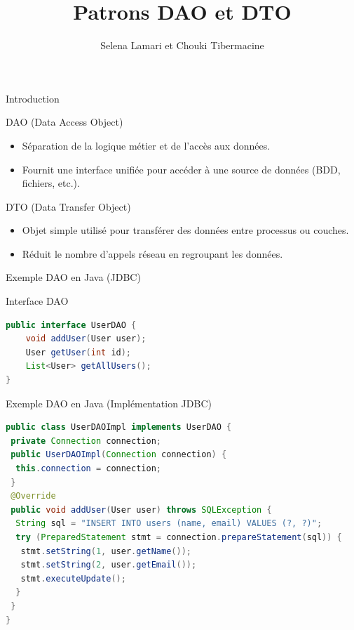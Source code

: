 \documentclass[aspectratio=169,10pt]{beamer}
\title{Patrons DAO et DTO}
\author[C. Tibermacine]{Selena Lamari et Chouki Tibermacine}
\date{}
\begin{document}
	


\begin{frame}{Introduction}
    \begin{block}{DAO (Data Access Object)}
        \begin{itemize}
            \item Séparation de la logique métier et de l'accès aux données.
            \item Fournit une interface unifiée pour accéder à une source de données (BDD, fichiers, etc.).
        \end{itemize}
    \end{block}
    \begin{block}{DTO (Data Transfer Object)}
        \begin{itemize}
            \item Objet simple utilisé pour transférer des données entre processus ou couches.
            \item Réduit le nombre d'appels réseau en regroupant les données.
        \end{itemize}
    \end{block}
\end{frame}

\begin{frame}[fragile]{Exemple DAO en Java (JDBC)}
    \begin{exampleblock}{Interface DAO}
        \begin{lstlisting}[language=Java]
public interface UserDAO {
    void addUser(User user);
    User getUser(int id);
    List<User> getAllUsers();
}
        \end{lstlisting}
    \end{exampleblock}
\end{frame}

\begin{frame}[fragile]{Exemple DAO en Java (Implémentation JDBC)}
        \begin{lstlisting}[language=Java]
public class UserDAOImpl implements UserDAO {
 private Connection connection;
 public UserDAOImpl(Connection connection) {
  this.connection = connection;
 }
 @Override
 public void addUser(User user) throws SQLException {
  String sql = "INSERT INTO users (name, email) VALUES (?, ?)";
  try (PreparedStatement stmt = connection.prepareStatement(sql)) {
   stmt.setString(1, user.getName());
   stmt.setString(2, user.getEmail());
   stmt.executeUpdate();
  }
 }
}
\end{lstlisting}
\end{frame}
\end{document}
